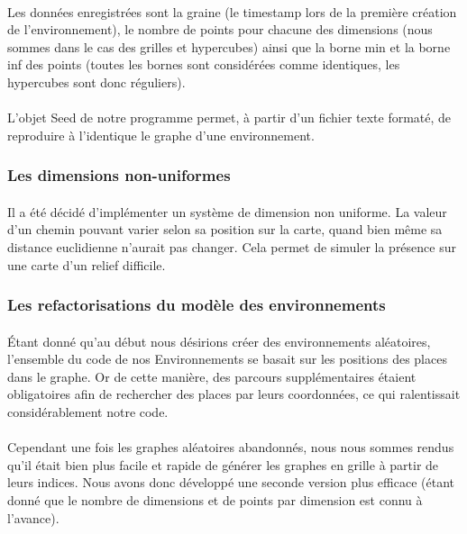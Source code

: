 \documentclass[pidr]{tnreport}
\begin{document}
\paragraph{}
Les données enregistrées sont la graine (le timestamp lors de la première création de l'environnement), le nombre de points pour chacune des dimensions (nous sommes dans le cas des grilles et hypercubes) ainsi que la borne min et la borne inf des points (toutes les bornes sont considérées comme identiques, les hypercubes sont donc réguliers).

\paragraph{}
L'objet Seed de notre programme permet, à partir d'un fichier texte formaté, de reproduire à l'identique le graphe d'une environnement.

			\subsubsection{Les dimensions non-uniformes}
\paragraph{}
Il a été décidé d'implémenter un système de dimension non uniforme. La valeur d'un chemin pouvant varier selon sa position sur la carte, quand bien même sa distance euclidienne n'aurait pas changer. Cela permet de simuler la présence sur une carte d'un relief difficile. 

			\subsubsection{Les refactorisations du modèle des environnements}

\paragraph{}
Étant donné qu'au début nous désirions créer des environnements aléatoires, l'ensemble du code de nos Environnements se basait sur les positions des places dans le graphe. Or de cette manière, des parcours supplémentaires étaient obligatoires afin de rechercher des places par leurs coordonnées, ce qui ralentissait considérablement notre code. 
\paragraph{}
Cependant une fois les graphes aléatoires abandonnés, nous nous sommes rendus qu'il était bien plus facile et rapide de générer les graphes en grille à partir de leurs indices. Nous avons donc développé une seconde version plus efficace (étant donné que le nombre de dimensions et de points par dimension est connu à l'avance).
\end{document}
